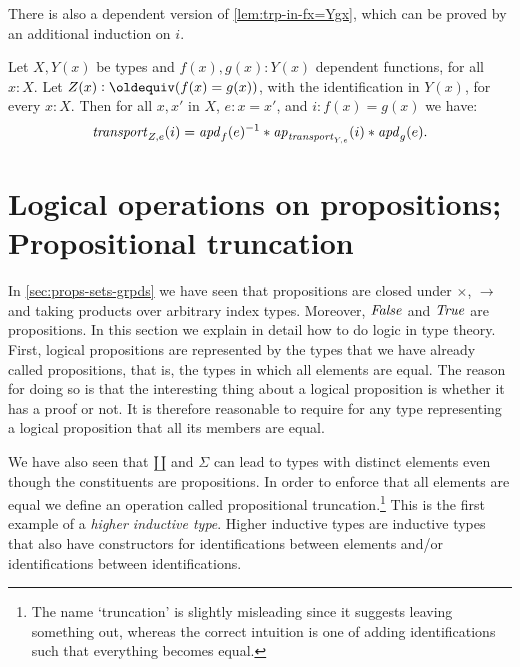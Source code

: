 There is also a dependent version of \cref{lem:trp-in-fx=Ygx},
which can be proved by an additional induction on $i$.

\begin{lemma}\label{lem:trp-in-fx=Yxgx}
Let $X,Y(x)$ be types and $f(x),g(x): Y(x)$ dependent functions, 
for all $x:X$. Let $Z(x)\defeq (f(x)=g(x))$,
with the identification in $Y(x)$, for every $x:X$. 
Then for all $x,x'$ in $X$, $e: x=x'$, and $i: f(x)=g(x)$ we have:
\[
\mathord{\mathit{transport}}_{Z, e} (i) = \mathop{{\it apd}_{f}}(e)^{-1} * \mathop{{\it ap}_{\mathord{\mathit{transport}}_{Y,e}}}(i) * \mathop{{\it apd}_{g}}(e).
\]
\end{lemma}

\section{Logical operations on propositions; Propositional truncation}
\label{sec:logical-operations}

In \cref{sec:props-sets-grpds} we have seen that propositions are
closed under $\times$, $\to$ and taking products over arbitrary
index types. Moreover, $\mathop{\mathit{False}}$ and $\mathop{\mathit{True}}$ are propositions.
In this section we explain in detail how to do logic in type theory.
First, logical propositions are represented by the types that we
have already called propositions, that is, the types in which all
elements are equal. The reason for doing so is that the interesting
thing about a logical proposition is whether it has a proof or not.
It is therefore reasonable to require for any type representing 
a logical proposition that all its members are equal.

We have also seen that ${\amalg}$ and $\Sigma$ can lead to types
with distinct elements even though the constituents are
propositions. In order to enforce that all elements are equal
we define an operation called propositional truncation.\footnote{%
The name `truncation' is slightly misleading since it suggests leaving
something out, whereas the correct intuition is one of adding identifications
such that everything becomes equal.}
This is the first example of a \emph{higher inductive type}.
Higher inductive types are inductive types that also have
constructors for identifications between elements and/or
identifications between identifications.

